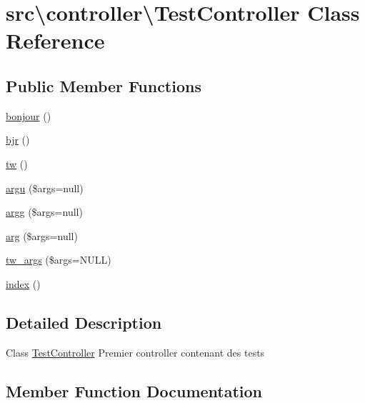 \hypertarget{classsrc_1_1controller_1_1TestController}{}\section{src\textbackslash{}controller\textbackslash{}Test\+Controller Class Reference}
\label{classsrc_1_1controller_1_1TestController}
\subsection*{Public Member Functions}
\begin{DoxyCompactItemize}
\item 
\hyperlink{classsrc_1_1controller_1_1TestController_ae806c71db8b8b6610f3d98682610dbd0}{bonjour} ()
\item 
\hyperlink{classsrc_1_1controller_1_1TestController_a89f2ca839f0ad742704339ec3046b5fd}{bjr} ()
\item 
\hyperlink{classsrc_1_1controller_1_1TestController_a5b18ce9e909480d9df3dc68ed606751c}{tw} ()
\item 
\hyperlink{classsrc_1_1controller_1_1TestController_ac90329f331951e280e263534a8f87978}{argu} (\$args=null)
\item 
\hyperlink{classsrc_1_1controller_1_1TestController_acf5c393ac7da9bb92b49a12ea2b74fcc}{argg} (\$args=null)
\item 
\hyperlink{classsrc_1_1controller_1_1TestController_a7cf713971790f8d82ae643b10427dad4}{arg} (\$args=null)
\item 
\hyperlink{classsrc_1_1controller_1_1TestController_a41d454675682d64bb46f9ee050337018}{tw\+\_\+args} (\$args=N\+U\+LL)
\item 
\hyperlink{classsrc_1_1controller_1_1TestController_a7681eb939f1689ba052b0cee9d37eaca}{index} ()
\end{DoxyCompactItemize}


\subsection{Detailed Description}
Class \hyperlink{classsrc_1_1controller_1_1TestController}{Test\+Controller} Premier controller contenant des tests 

\subsection{Member Function Documentation}
